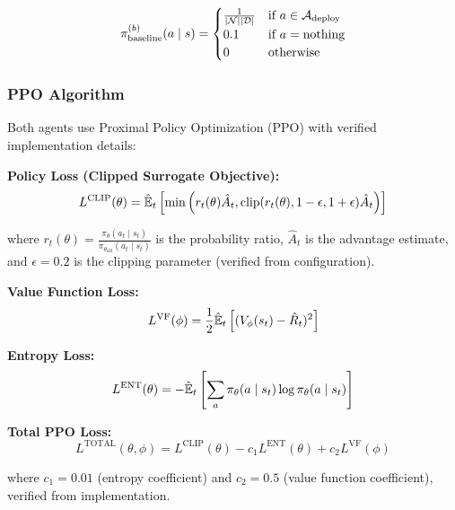 \documentclass[12pt,oneside,a4paper]{article}
\theoremstyle{definition}
\theoremstyle{plain}
\begin{document}
\begin{equation}
\pi^{(b)}_{\text{baseline}}(a \mid s) = \begin{cases}
\frac{1}{|\mathcal{N}||\mathcal{D}|} & \text{if } a \in \mathcal{A}_{\text{deploy}} \\
0.1 & \text{if } a = \text{nothing} \\
0 & \text{otherwise}
\end{cases}
\end{equation}

\subsubsection{PPO Algorithm}

Both agents use Proximal Policy Optimization (PPO) with verified implementation details:

\textbf{Policy Loss (Clipped Surrogate Objective):}
\begin{equation}
L^{\text{CLIP}}(\theta) = \hat{\mathbb{E}}_t\left[\min\left(r_t(\theta)\hat{A}_t, \text{clip}(r_t(\theta), 1-\epsilon, 1+\epsilon)\hat{A}_t\right)\right]
\end{equation}

where $r_t(\theta) = \frac{\pi_\theta(a_t \mid s_t)}{\pi_{\theta_{\text{old}}}(a_t \mid s_t)}$ is the probability ratio, $\hat{A}_t$ is the advantage estimate, and $\epsilon = 0.2$ is the clipping parameter (verified from configuration).

\textbf{Value Function Loss:}
\begin{equation}
L^{\text{VF}}(\phi) = \frac{1}{2}\hat{\mathbb{E}}_t\left[(V_\phi(s_t) - \hat{R}_t)^2\right]
\end{equation}

\textbf{Entropy Loss:}
\begin{equation}
L^{\text{ENT}}(\theta) = -\hat{\mathbb{E}}_t\left[\sum_a \pi_\theta(a \mid s_t) \log \pi_\theta(a \mid s_t)\right]
\end{equation}

\textbf{Total PPO Loss:}
\begin{equation}
L^{\text{TOTAL}}(\theta, \phi) = L^{\text{CLIP}}(\theta) - c_1 L^{\text{ENT}}(\theta) + c_2 L^{\text{VF}}(\phi)
\end{equation}

where $c_1 = 0.01$ (entropy coefficient) and $c_2 = 0.5$ (value function coefficient), verified from implementation.
\end{document}
